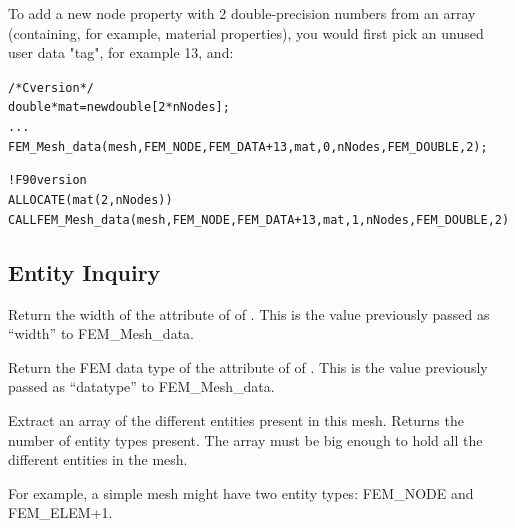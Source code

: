 To add a new node property with 2 double-precision numbers 
from an array  (containing, for example,
material properties), you would first pick an unused
user data "tag", for example 13, and:

  \begin{alltt}
/* C version */
   double *mat=new double[2*nNodes];
   ...
   FEM\_Mesh\_data(mesh,FEM\_NODE, FEM\_DATA+13, mat, 0,nNodes, FEM\_DOUBLE, 2);
   
! F90 version
   ALLOCATE(mat(2,nNodes))
   CALL FEM\_Mesh\_data(mesh,FEM\_NODE,FEM\_DATA+13, mat, 1,nNodes, FEM\_DOUBLE, 2)
  \end{alltt}


\subsection{Entity Inquiry}


Return the width of the attribute  of  of .
This is the value previously passed as ``width'' to FEM\_Mesh\_data.



Return the FEM data type of the attribute  of  of .
This is the value previously passed as ``datatype'' to FEM\_Mesh\_data.



Extract an array of the different entities present in this mesh.
Returns the number of entity types present.  The 
array must be big enough to hold all the different entities in
the mesh.

For example, a simple mesh might have two entity types:
FEM\_NODE and FEM\_ELEM+1.



